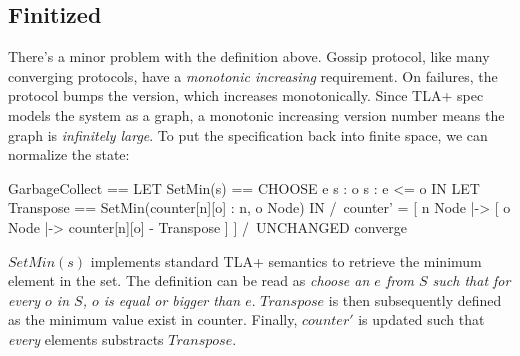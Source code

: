 \documentclass{report}
\begin{document}
\subsection{Finitized}

There's a minor problem with the definition above. Gossip protocol, like many
converging protocols, have a \textit{monotonic increasing} requirement. On
failures, the protocol bumps the version, which increases monotonically. Since
TLA+ spec models the system as a graph, a monotonic increasing version number
means the graph is \textit{infinitely large}. To put the specification back into
finite space, we can normalize the state:\newline

\begin{tla}
GarbageCollect ==
    LET SetMin(s) == CHOOSE e \in s : \A o \in s : e <= o IN
    LET Transpose == SetMin({counter[n][o] : n, o \in Node}) IN
        /\ counter' = [
            n \in Node |-> [
                o \in Node |-> counter[n][o] - Transpose
            ]
          ]
        /\ UNCHANGED converge
\end{tla}
\begin{tlatex}
%
\@x{\@s{36.79} \.{\land} counter \.{'} \.{=} [}%
\@x{\@s{52.01} n \.{\in} Node \.{\mapsto} [}%
\@x{\@s{52.01} ]}%
\@x{\@s{44.99} ]}%
%
\end{tlatex}

$SetMin(s)$ implements standard TLA+ semantics to retrieve the minimum element
in the set. The definition can be read as \textit{choose an $e$ from $S$ such
that for every $o$ in $S$, $o$ is equal or bigger than $e$}. $Transpose$ is then
subsequently defined as the minimum value exist in counter. Finally, $counter'$
is updated such that \textit{every} elements substracts $Transpose$.


\end{document}
